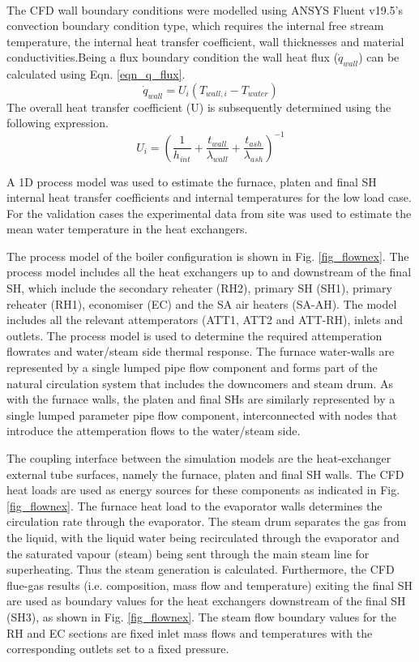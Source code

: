 \documentclass[twocolumn,10pt]{asme2ej}
\begin{document}
The CFD wall boundary conditions were modelled using ANSYS Fluent v19.5\textsuperscript{\textregistered}’s convection boundary condition type, which requires the internal free stream temperature, the internal heat transfer coefficient, wall thicknesses and material conductivities.Being a flux boundary condition the wall heat flux ($\dot{q}_{wall}$) can be calculated using Eqn. \ref{eqn_q_flux}.
\begin{equation}\label{eqn_q_flux}
\dot{q}_{wall} = U_i(T_{wall,i}-T_{water})
\end{equation}
The overall heat transfer coefficient (U) is subsequently determined using the following expression.
\begin{equation}\label{eqn_overall_heat_coeff}
U_i=\left(\frac{1}{h_{int}}+\frac{t_{wall}}{\lambda_{wall}}+\frac{t_{ash}}{\lambda_{ash}}\right)^{-1}
\end{equation}

A 1D process model was used to estimate the furnace, platen and final SH internal heat transfer coefficients and internal temperatures for the low load case. For the validation cases the experimental data from site was used to estimate the mean water temperature in the heat exchangers.

The process model of the boiler configuration is shown in Fig. \ref{fig_flownex}. The process model includes all the heat exchangers up to and downstream of the final SH, which include the secondary reheater (RH2), primary SH (SH1), primary reheater (RH1), economiser (EC) and the SA air heaters (SA-AH). The model includes all the relevant attemperators (ATT1, ATT2 and ATT-RH), inlets and outlets. The process model is used to determine the required attemperation flowrates and water/steam side thermal response. The furnace water-walls are represented by a single lumped pipe flow component and forms part of the natural circulation system that includes the downcomers and steam drum. As with the furnace walls, the platen and final SHs are similarly represented by a single lumped parameter pipe flow component, interconnected with nodes that introduce the attemperation flows to the water/steam side.

The coupling interface between the simulation models are the heat-exchanger external tube surfaces, namely the furnace, platen and final SH walls. The CFD heat loads are used as energy sources for these components as indicated in Fig. \ref{fig_flownex}. The furnace heat load to the evaporator walls determines the circulation rate through the evaporator. The steam drum separates the gas from the liquid, with the liquid water being recirculated through the evaporator and the saturated vapour (steam) being sent through the main steam line for superheating. Thus the steam generation is calculated. Furthermore, the CFD flue-gas results (i.e. composition, mass flow and temperature) exiting the final SH are used as boundary values for the heat exchangers downstream of the final SH (SH3), as shown in Fig. \ref{fig_flownex}. The steam flow boundary values for the RH and EC sections are fixed inlet mass flows and temperatures with the corresponding outlets set to a fixed pressure.
\end{document}
